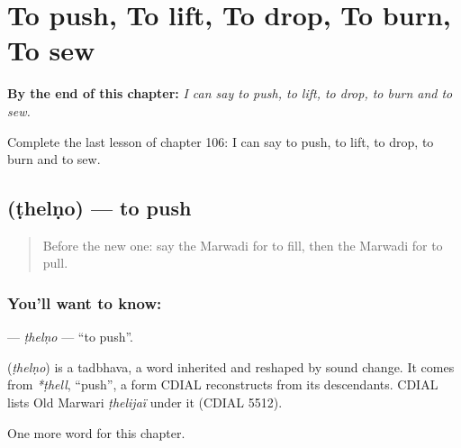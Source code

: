 
\chapter{To push, To lift, To drop, To burn, To sew}
\label{ch:mw-to-push-to-lift-to-drop-to-burn-to-sew}

\begin{chapteropening}
\textbf{By the end of this chapter:} \emph{I can say to push, to lift, to drop, to burn and to sew.}

Complete the last lesson of chapter 106: I can say to push, to lift, to drop, to burn and to sew.
\end{chapteropening}

\section[\texorpdfstring{\mw{ठेलणो} (ṭhelṇo)}{ठेलणो (ṭhelṇo)}]{ (ṭhelṇo) — to push}

\label{lesson:MW-C106-thelno}



\begin{quote}
Before the new one: say the Marwadi for to fill, then the Marwadi for to pull.
\end{quote}

\subsection*{You'll want to know: }
\textbf{} — \emph{ṭhelṇo} — \textquotedblleft{}to push\textquotedblright{}.

\begin{cousinweb}
\textbf{} (\emph{ṭhelṇo}) is a tadbhava, a word inherited and reshaped by sound change. It comes from \emph{*ṭhell}, \textquotedblleft{}push\textquotedblright{}, a form CDIAL reconstructs from its descendants. CDIAL lists Old Marwari \emph{ṭhelijaï} under it (CDIAL 5512).
\end{cousinweb}

\begin{grammarlens}[title={What you've built}]
One more word for this chapter.
\end{grammarlens}

